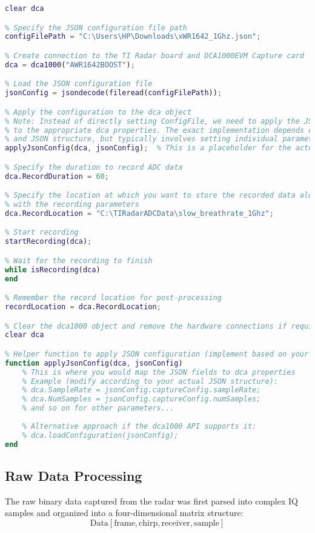 \documentclass[12pt]{article}
\begin{document}
\begin{lstlisting}[language=Matlab]
% Clear existing dca1000 object
clear dca

% Specify the JSON configuration file path
configFilePath = "C:\Users\HP\Downloads\xWR1642_1Ghz.json";

% Create connection to the TI Radar board and DCA1000EVM Capture card
dca = dca1000("AWR1642BOOST");

% Load the JSON configuration file
jsonConfig = jsondecode(fileread(configFilePath));

% Apply the configuration to the dca object
% Note: Instead of directly setting ConfigFile, we need to apply the JSON settings
% to the appropriate dca properties. The exact implementation depends on the DCA1000 API
% and JSON structure, but typically involves setting individual parameters.
applyJsonConfig(dca, jsonConfig);  % This is a placeholder for the actual implementation

% Specify the duration to record ADC data
dca.RecordDuration = 60;

% Specify the location at which you want to store the recorded data along
% with the recording parameters
dca.RecordLocation = "C:\TIRadarADCData\slow_breathrate_1Ghz";

% Start recording
startRecording(dca);

% Wait for the recording to finish
while isRecording(dca)
end

% Remember the record location for post-processing
recordLocation = dca.RecordLocation;

% Clear the dca1000 object and remove the hardware connections if required
clear dca

% Helper function to apply JSON configuration (implement based on your JSON structure)
function applyJsonConfig(dca, jsonConfig)
    % This is where you would map the JSON fields to dca properties
    % Example (modify according to your actual JSON structure):
    % dca.SampleRate = jsonConfig.captureConfig.sampleRate;
    % dca.NumSamples = jsonConfig.captureConfig.numSamples;
    % and so on for other parameters...
    
    % Alternative approach if the dca1000 API supports it:
    % dca.loadConfiguration(jsonConfig);
end
\end{lstlisting}

\subsection{Raw Data Processing}
The raw binary data captured from the radar was first parsed into complex IQ samples and organized into a four-dimensional matrix structure:
\begin{equation}
\text{Data}[\text{frame}, \text{chirp}, \text{receiver}, \text{sample}]
\end{equation}
\end{document}
